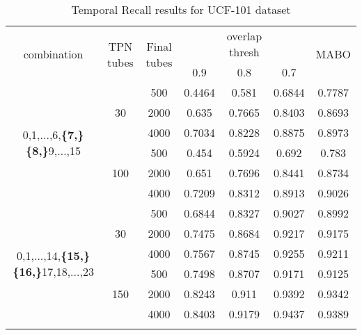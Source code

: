 \begin{center}
\begin{longtable}{||c | c | c ||c c c| c|}


  \hline
  \multirow{2}{*}{combination} & \multirow{2}{2.5em}{TPN tubes} & \multirow{2}{2.5em}{Final tubes} &  {} &overlap thresh & {} & \multirow{2}{*}{MABO} \\
  {} & {} & {} &  0.9 &  0.8 & 0.7 & {}\\         
  \hline
  
  
  \multirow{6}{7em}{0,1,...,6,\textbf{\{7,\}}
  \textbf{\{8,\}}9,...,15 }  & \multirow{3}{*}{30} & 500   & 0.4464  & 0.581 & 0.6844  & 0.7787 \\
  \cline{3-7}
  {} &  {}   & 2000   & 0.635  & 0.7665 & 0.8403 & 0.8693 \\
  \cline{3-7}
  {} &  {}   & 4000   & 0.7034  & 0.8228 & 0.8875 & 0.8973 \\
  \cline{2-7}
  {} &  \multirow{3}{*}{100}   & 500   & 0.454 & 0.5924 & 0.692 & 0.783 \\
  \cline{3-7}
  {} &  {}   & 2000   & 0.651 & 0.7696 & 0.8441 &0.8734 \\
  \cline{3-7}
  {} &  {}   & 4000   & 0.7209 &0.8312 & 0.8913 & 0.9026 \\

  \hline                                    
  \multirow{6}{7em}{0,1,...,14,\textbf{\{15,\}}
  \textbf{\{16,\}}17,18,...,23 }  & \multirow{3}{*}{30} & 500   & 0.6844 &0.8327 & 0.9027 & 0.8992 \\
  \cline{3-7}
                                    {} &  {}   & 2000   & 0.7475 & 0.8684 & 0.9217 & 0.9175 \\
  \cline{3-7}
                                    {} &  {}   & 4000   & 0.7567  & 0.8745  & 0.9255 & 0.9211 \\
  \cline{2-7}
                                    {} &  \multirow{3}{*}{150}   & 500   & 0.7498 &0.8707 &0.9171 & 0.9125 \\
  \cline{3-7}
                                    {} &  {}   & 2000   & 0.8243 & 0.911 & 0.9392 & 0.9342\\
  \cline{3-7}
                                    {} &  {}   & 4000   &  0.8403  & 0.9179 & 0.9437 & 0.9389\\
  \hline                                    
  \caption{Temporal Recall results for UCF-101 dataset}
  \label{table:ucf_temp_recall }
\end{longtable} 
\end{center}

